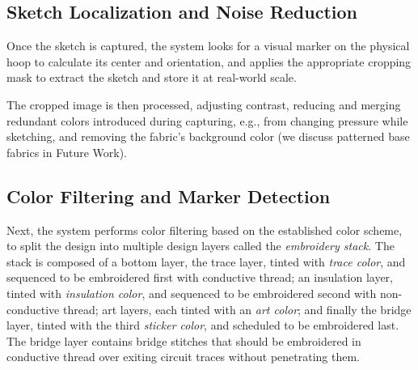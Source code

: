 \subsection{Sketch Localization and Noise Reduction}
Once the sketch is captured, the system looks for a visual marker on the physical hoop to calculate its center and orientation, and applies the appropriate cropping mask to extract the sketch and store it at real-world scale.

The cropped image is then processed, adjusting contrast, reducing and merging redundant colors introduced during capturing, e.g., from changing pressure while sketching, and removing the fabric's background color (we discuss patterned base fabrics in Future Work).




\subsection{Color Filtering and Marker Detection}
Next, the system performs color filtering based on the established color scheme, to split the design into multiple design layers called the \emph{embroidery stack}. The stack is composed of a bottom layer, the trace layer, tinted with \textit{trace color}, and sequenced to be embroidered first with conductive thread; an insulation layer, tinted with \textit{insulation color}, and sequenced to be embroidered second with non-conductive thread; art layers, each tinted with an \textit{art color}; and finally the bridge layer, tinted with the third \textit{sticker color}, and scheduled to be embroidered last. The bridge layer contains bridge stitches that should be embroidered in conductive thread over exiting circuit traces without penetrating them.

